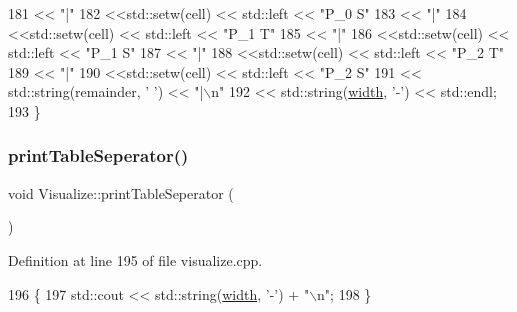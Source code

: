 \begin{DoxyCode}
181               << \textcolor{stringliteral}{"|"}
182               <<std::setw(cell) << std::left << \textcolor{stringliteral}{"P\_0 S"}
183               << \textcolor{stringliteral}{"|"}
184               <<std::setw(cell) << std::left << \textcolor{stringliteral}{"P\_1 T"}
185               << \textcolor{stringliteral}{"|"}
186               <<std::setw(cell) << std::left << \textcolor{stringliteral}{"P\_1 S"}
187               << \textcolor{stringliteral}{"|"}
188               <<std::setw(cell) << std::left << \textcolor{stringliteral}{"P\_2 T"}
189               << \textcolor{stringliteral}{"|"}
190               <<std::setw(cell) << std::left << \textcolor{stringliteral}{"P\_2 S"}
191               << std::string(remainder, \textcolor{charliteral}{' '}) << \textcolor{stringliteral}{"|\(\backslash\)n"}
192               << std::string(\hyperlink{class_visualize_af5ac723ad5f8fe8c4a8378bf1299cda7}{width}, \textcolor{charliteral}{'-'}) << std::endl;
193 \}
\end{DoxyCode}
\mbox{\label{class_visualize_a2d38641cb335d7bbf7e11567b07e2d85}} 
\subsubsection{\texorpdfstring{print\+Table\+Seperator()}{printTableSeperator()}}
{\footnotesize\ttfamily void Visualize\+::print\+Table\+Seperator (\begin{DoxyParamCaption}{ }\end{DoxyParamCaption})}



Definition at line 195 of file visualize.\+cpp.


\begin{DoxyCode}
196 \{
197     std::cout << std::string(\hyperlink{class_visualize_af5ac723ad5f8fe8c4a8378bf1299cda7}{width}, \textcolor{charliteral}{'-'}) + \textcolor{stringliteral}{"\(\backslash\)n"};
198 \}
\end{DoxyCode}
\mbox{\label{class_visualize_a8aefacec622221533485db6701d1119e}} 
